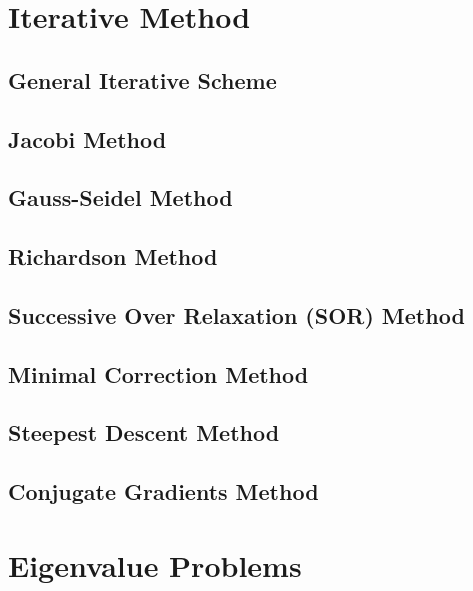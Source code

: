 \documentclass[12pt]  {article}%
\begin{document}
\section{Iterative Method}
\subsection{General Iterative Scheme}
\subsection{Jacobi Method}
\subsection{Gauss-Seidel Method}
\subsection{Richardson Method}
\subsection{Successive Over Relaxation (SOR) Method}
\subsection{Minimal Correction Method}
\subsection{Steepest Descent Method}
\subsection{Conjugate Gradients Method}



\section{Eigenvalue Problems}
\end{document}
